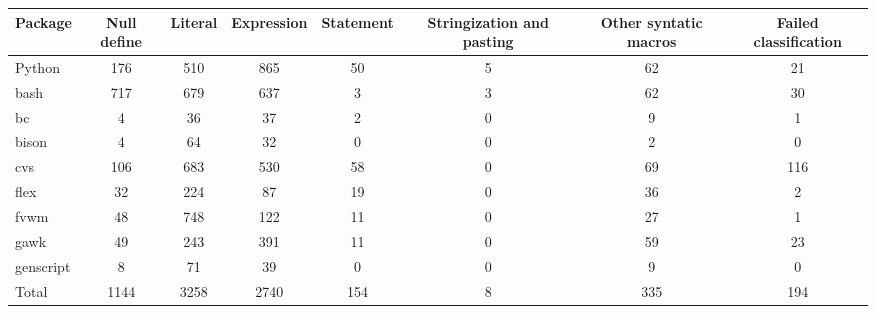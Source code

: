 \begin{tabular}{|l|c|c|c|c|c|c|c|}\hline
Package & Null define & Literal & Expression & Statement & Stringization and pasting & Other syntatic macros & Failed classification\\\hline
Python & 176 & 510 & 865 & 50 & 5 & 62 & 21\\\hline
bash & 717 & 679 & 637 & 3 & 3 & 62 & 30\\\hline
bc & 4 & 36 & 37 & 2 & 0 & 9 & 1\\\hline
bison & 4 & 64 & 32 & 0 & 0 & 2 & 0\\\hline
cvs & 106 & 683 & 530 & 58 & 0 & 69 & 116\\\hline
flex & 32 & 224 & 87 & 19 & 0 & 36 & 2\\\hline
fvwm & 48 & 748 & 122 & 11 & 0 & 27 & 1\\\hline
gawk & 49 & 243 & 391 & 11 & 0 & 59 & 23\\\hline
genscript & 8 & 71 & 39 & 0 & 0 & 9 & 0\\\hline
\hline
Total & 1144 & 3258 & 2740 & 154 & 8 & 335 & 194\\\hline
\end{tabular}\\\hline
